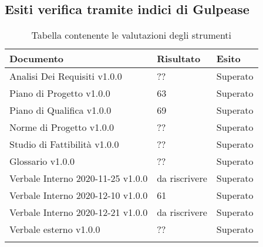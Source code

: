 \documentclass[../piano_di_qualifica.tex]{subfiles}
\begin{document}
\subsection{Esiti verifica tramite indici di Gulpease}
\label{sub:verif_gul}

\begin{center}
	\begin{longtable}{|p{4.5cm}|p{2.5cm}|p{3cm}|}
		\hline
		\rowcolor{lightgray}
            \textbf{Documento} & \textbf{Risultato} &  \textbf{Esito} \\
            \hline 
            Analisi Dei Requisiti v1.0.0 & ?? & Superato \\
            \hline
            \hline 
            Piano di Progetto v1.0.0 & 63 & Superato \\
            \hline 
            Piano di Qualifica v1.0.0 & 69 & Superato \\
            \hline 
            Norme di Progetto v1.0.0 & ?? & Superato \\
            \hline 
            Studio di Fattibilità v1.0.0 & ?? & Superato \\
            \hline 
            Glossario v1.0.0 & ?? & Superato \\
            \hline 
            Verbale Interno 2020-11-25 v1.0.0 & da riscrivere & Superato \\
            \hline 
            Verbale Interno 2020-12-10 v1.0.0 & 61 & Superato \\
            \hline 
            Verbale Interno 2020-12-21 v1.0.0 & da riscrivere & Superato \\
            \hline 
            Verbale esterno v1.0.0 & ?? & Superato \\
            \hline
            \hline

\caption{Tabella contenente le valutazioni degli strumenti}
\end{longtable}
\end{center}
\end{document}
